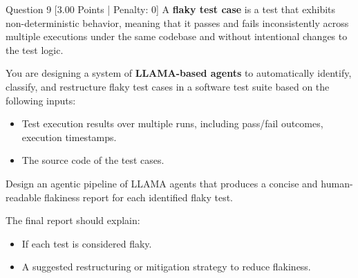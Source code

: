 \documentclass[11pt,a4paper]{article}
\begin{document}
\begin{questionbox}{Question 9 \hfill [3.00 Points | Penalty: 0]}
A \textbf{flaky test case} is a test that exhibits non-deterministic behavior, meaning that it passes and fails inconsistently across multiple executions under the same codebase and without intentional changes to the test logic.

\medskip
\noindent
You are designing a system of \textbf{LLAMA-based agents} to automatically identify, classify, and restructure flaky test cases in a software test suite based on the following inputs:
\begin{itemize}[leftmargin=1.5em]
    \item Test execution results over multiple runs, including pass/fail outcomes, execution timestamps.
    \item The source code of the test cases.
\end{itemize}

\medskip
\noindent
Design an agentic pipeline of LLAMA agents that produces a concise and human-readable flakiness report for each identified flaky test.

\medskip
\noindent
The final report should explain:
\begin{itemize}[leftmargin=1.5em]
    \item If each test is considered flaky.
    \item A suggested restructuring or mitigation strategy to reduce flakiness.
\end{itemize}
\end{questionbox}

\vspace{1.2em}
\end{document}
